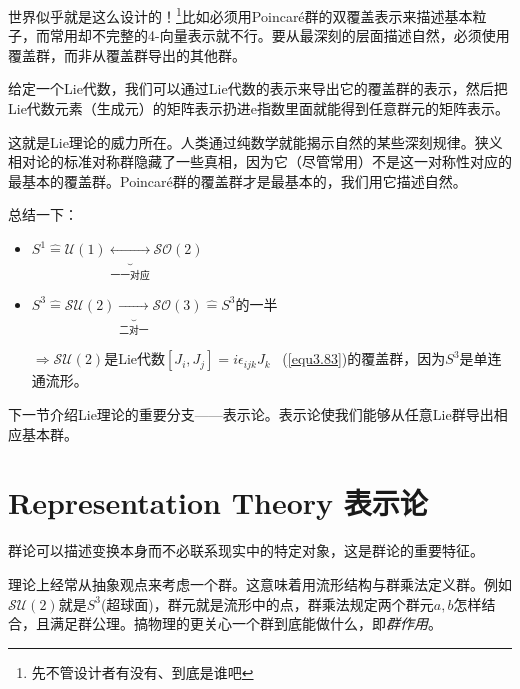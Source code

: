 世界似乎就是这么设计的！\footnote{先不管设计者有没有、到底是谁吧}比如必须用Poincar\'e群的双覆盖表示来描述基本粒子，而常用却不完整的4-向量表示就不行。要从最深刻的层面描述自然，必须使用覆盖群，而非从覆盖群导出的其他群。

给定一个Lie代数，我们可以通过Lie代数的表示来导出它的覆盖群的表示，然后把Lie代数元素（生成元）的矩阵表示扔进$\mathrm{e}$指数里面就能得到任意群元的矩阵表示。

这就是Lie理论的威力所在。人类通过纯数学就能揭示自然的某些深刻规律。狭义相对论的标准对称群隐藏了一些真相，因为它（尽管常用）不是这一对称性对应的最基本的覆盖群。Poincar\'e群的覆盖群才是最基本的，我们用它描述自然。

总结一下：

\begin{itemize}
	\item $S^1 \hat{=} \mathcal{U}(1) \underbrace{\longleftrightarrow}_{\text{一一对应}} \mathcal{SO}(2)$
	\item $S^3 \hat{=} \mathcal{SU}(2) \underbrace{\longrightarrow}_{\text{二对一}} \mathcal{SO}(3) \hat{=} S^3$的一半

		$\Rightarrow \mathcal{SU}(2)$是Lie代数$[J_i, J_j] = i\epsilon_{ijk} J_k$ \, (\eqref{equ3.83})的覆盖群，因为$S^3$是单连通流形。
\end{itemize}

下一节介绍Lie理论的重要分支——表示论。表示论使我们能够从任意Lie群导出相应基本群。



\section[表示论]{Representation Theory 表示论}
\label{sec3.5}
群论可以描述变换本身而不必联系现实中的特定对象，这是群论的重要特征。

理论上经常从抽象观点来考虑一个群。这意味着用流形结构与群乘法定义群。例如$\mathcal{SU}(2)$就是$S^3$(超球面)，群元就是流形中的点，群乘法规定两个群元$a,b$怎样结合，且满足群公理。搞物理的更关心一个群到底能做什么，即{\itshape 群作用}。

